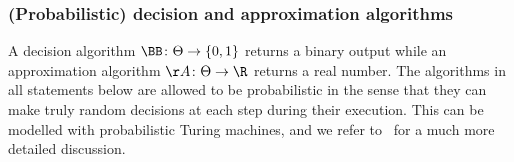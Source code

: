 \documentclass{amsart}[11pt]
\numberwithin{equation}{section}
\newcommand{\order}{\mathcal{O}}
\numberwithin{theorem}{section}
\begin{document}
\subsubsection{(Probabilistic) decision and approximation algorithms}\label{sec:probalg} 
A decision algorithm $\BB\colon \Theta \to \{0,1\}$ returns a binary output while an approximation algorithm $\AA\colon \Theta \to \R$ returns a real number.
The algorithms in all statements below are allowed to be probabilistic in the sense that they can make truly random decisions at each step during their execution.
This can be modelled with probabilistic Turing machines, and we refer to~\cite{sipser13} for a much more detailed discussion.


\end{document}
